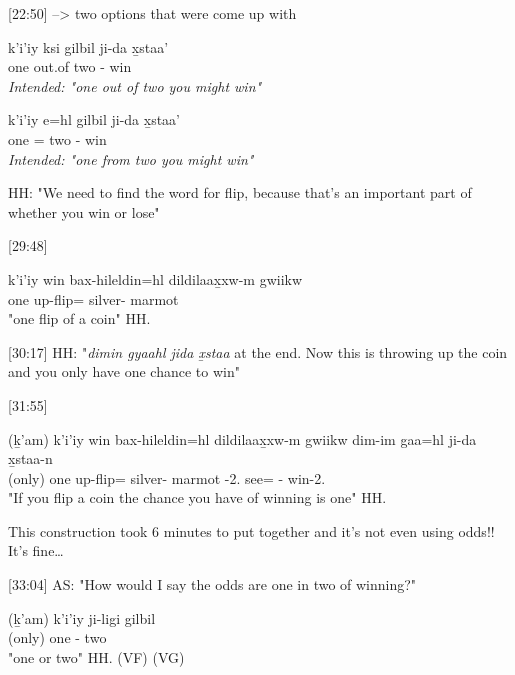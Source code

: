 [22:50] --> two options that were come up with
\begin{exe}
    \ex \begin{xlist}
    \item \gll 
    k'i'iy ksi gilbil ji-da x̱staa' \\
    one out.of two \Irr{}-\Spt{} win \\
    \glt \textit{Intended: "one out of two you might win"}
    \item \gll 
    k'i'iy e=hl gilbil ji-da x̱staa'\\
    one \Prep=\Cn{} two \Irr{}-\Spt{} win \\
    \glt \textit{Intended: "one from two you might win"}
    \end{xlist}
\end{exe}

HH: "We need to find the word for flip, because that's an important part of whether you win or lose"

[29:48]
\begin{exe}
\ex \gll 
k'i'iy win bax-hileldin=hl dildilaax̱xw-m gwiikw \\
one \Comp{} up-flip=\Cn{} silver-\Attr{} marmot \\
\glt "one flip of a coin" \hfill HH.\ElicitationDate{}
\end{exe}

[30:17] HH: "\textit{dimin gyaahl jida x̱staa} at the end. Now this is throwing up the coin and you only have one chance to win" 

[31:55]
\begin{exe}
\ex \gll 
(ḵ'am) k'i'iy win bax-hileldin=hl dildilaax̱xw-m gwiikw dim-im gaa=hl ji-da x̱staa-n \\
(only) one \Comp{} up-flip=\Cn{} silver-\Attr{} marmot \Fut{}-2.\I{} see=\Cn{} \Irr{}-\Spt{} win-2.\Ii{}\\
\glt "If you flip a coin the chance you have of winning is one" \hfill HH.\ElicitationDate{}
\end{exe}

This construction took 6 minutes to put together and it's not even using odds!! It's fine\dots

[33:04] AS: "How would I say the odds are one in two of winning?"
\begin{exe}
\ex \gll
(ḵ'am) k'i'iy ji-ligi gilbil \\
(only) one \Irr{}-\Dwid{} two \\
\glt "one or two" \hfill HH.\ElicitationDate{} (VF) (VG) 
\end{exe}

